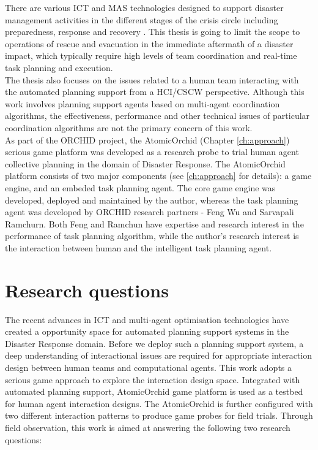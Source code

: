 There are various \ac{ICT} and \ac{MAS} technologies designed to support disaster management activities in the different stages of the crisis circle including preparedness, response and recovery \citep{Wattegama2012}. This thesis is going to limit the scope to operations of rescue and evacuation in the immediate aftermath of a disaster impact, which typically require high levels of team coordination and real-time task planning and execution.\\ 

The thesis also focuses on the issues related to a human team interacting with the automated planning support from a \ac{HCI}/\ac{CSCW} perspective. Although this work involves planning support agents based on multi-agent coordination algorithms, the effectiveness, performance and other technical issues of particular coordination algorithms are not the primary concern of this work.\\

As part of the ORCHID project, the AtomicOrchid (Chapter \ref{ch:approach}) serious game platform was developed as a research probe to trial human agent collective planning in the domain of Disaster Response. The AtomicOrchid platform consists of two major components (see \ref{ch:approach} for details): a game engine, and an embeded task planning agent. The core game engine was developed, deployed and maintained by the author, whereas the task planning agent was developed by ORCHID research partners - Feng Wu and Sarvapali Ramchurn. Both Feng and Ramchun have expertise and research interest in the performance of task planning algorithm, while the author's research interest is the interaction between human and the intelligent task planning agent. \\

\section{Research questions}
The recent advances in \ac{ICT} and multi-agent optimisation technologies have created a opportunity space for automated planning support systems in the Disaster Response domain. Before we deploy such a planning support system, a deep understanding of interactional issues are required for appropriate interaction design between human teams and computational agents. This work adopts a serious game approach to explore the interaction design space. Integrated with automated planning support, AtomicOrchid game platform is used as a testbed for human agent interaction designs.  The AtomicOrchid is further configured with two different interaction patterns to produce game probes for field trials. Through field observation, this work is aimed at answering the following two research questions:

